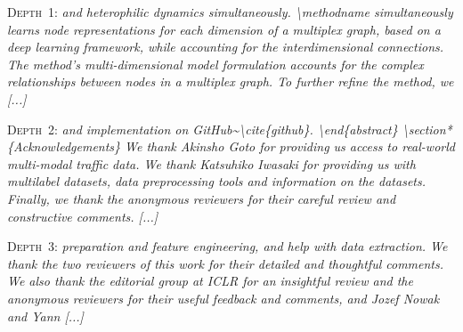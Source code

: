 \noindent\textsc{Depth~1:} {\small\itshape and heterophilic dynamics simultaneously. \textbackslash methodname simultaneously learns node representations for each dimension of a multiplex graph, based on a deep learning framework, while accounting for the interdimensional connections. The method's multi-dimensional model formulation accounts for the complex relationships between nodes in a multiplex graph. To further refine the method, we [...]}
\smallskip

\noindent\textsc{Depth~2:} {\small\itshape and implementation on GitHub\textasciitilde{}\textbackslash cite\{github\}. \textbackslash end\{abstract\} \textbackslash section*\{Acknowledgements\} We thank Akinsho Goto for providing us access to real-world multi-modal traffic data. We thank Katsuhiko Iwasaki for providing us with multilabel datasets, data preprocessing tools and information on the datasets. Finally, we thank the anonymous reviewers for their careful review and constructive comments. [...]}
\smallskip

\noindent\textsc{Depth~3:} {\small\itshape preparation and feature engineering, and help with data extraction. We thank the two reviewers of this work for their detailed and thoughtful comments. We also thank the editorial group at ICLR for an insightful review and the anonymous reviewers for their useful feedback and comments, and Jozef Nowak and Yann [...]}

\medskip
